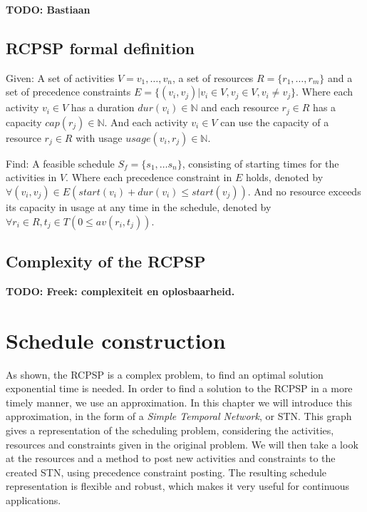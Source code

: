 \documentclass{article}
\theoremstyle{definition}
\newcommand{\TODO}[1]{{\color{red}\textbf{TODO: #1}}}
\newcommand{\av}[2]{\ensuremath{av(r_{#1}, t_{#2})}} %
\newcommand{\capa}[1]{\ensuremath{cap(r_{#1})}} %
\newcommand{\dur}[1]{\ensuremath{dur(v_{#1})}} %
\newcommand{\usage}[2]{\ensuremath{usage(v_{#1}, r_{#2})}} %
\newcommand{\start}[1]{\ensuremath{start(v_{#1})}} %
\newenvironment{definition}[1][Definition]{\begin{trivlist}
\item[\hskip \labelsep {\bfseries #1}]}{\end{trivlist}}
\begin{document}
\TODO{Bastiaan}


\subsection{RCPSP formal definition}

\begin{definition}
Given:
A set of activities $V = v_1, \ldots, v_n$, a set of resources $R = \{r_1, \ldots, r_m\}$ and a set of precedence constraints $E =  \{(v_i, v_j) | v_i \in V, v_j \in V, v_i \neq v_j\}$.
Where each activity $v_i \in V$ has a duration $\dur{i} \in \mathbb{N}$ and each resource $r_j \in R$ has a capacity $\capa{j} \in \mathbb{N}$. 
And each activity $v_i \in V$ can use the capacity of a resource $r_j \in R$ with usage $\usage{i}{j} \in \mathbb{N}$.

Find:
A feasible schedule $S_f = \{s_1, \ldots s_n\}$, consisting of starting times for the activities in $V$.
Where each precedence constraint in $E$ holds, denoted by $\forall (v_i, v_j) \in E (\start{i} + \dur{i} \leq \start{j})$.
And no resource exceeds its capacity in usage at any time in the schedule, denoted by $\forall r_i \in R, t_j \in T (0 \leq \av{i}{j})$.
\end{definition}


\subsection{Complexity of the RCPSP}
\TODO{Freek: complexiteit en oplosbaarheid.}


\newpage


\section{Schedule construction}

As shown, the RCPSP is a complex problem, to find an optimal solution exponential time is needed.
In order to find a solution to the RCPSP in a more timely manner, we use an approximation.
In this chapter we will introduce this approximation, in the form of a \emph{Simple Temporal Network}, or STN.
This graph gives a representation of the scheduling problem, considering the activities, resources and constraints given in the original problem.
We will then take a look at the resources and a method to post new activities and constraints to the created STN, using precedence constraint posting.
The resulting schedule representation is flexible and robust, which makes it very useful for continuous applications.
\end{document}
